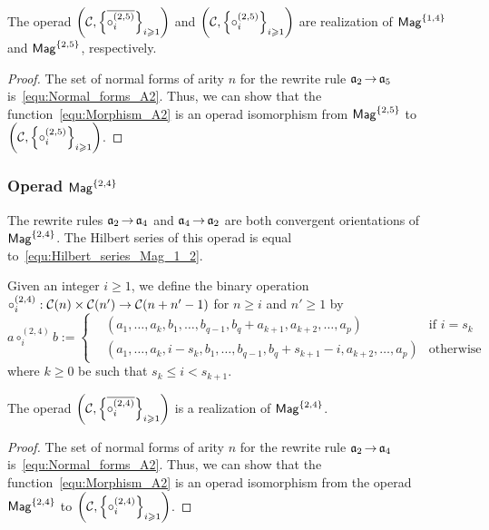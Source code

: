 \begin{Proposition} \label{prop:Realisation_Mag_1_4}
The operad
$\left(\mathcal{C}, \left\{\overline{\circ_i^{(2,5)}}\right\}_{i \geqslant 1}
\right)$ and
$\left(\mathcal{C}, \left\{\circ_i^{(2,5)}\right\}_{i \geqslant 1}\right)$
are realization of $\mathsf{Mag}^{\{1, 4\}}$ and $\mathsf{Mag}^{\{2, 5\}}$, respectively.
\end{Proposition}

\begin{proof}
The set of normal forms of arity $n$ for the rewrite rule
$\mathfrak{a}_2 \operatorname{\to} \mathfrak{a}_5$ is~\eqref{equ:Normal_forms_A2}. Thus, we can show
that the function~\eqref{equ:Morphism_A2} is an operad isomorphism from
$\mathsf{Mag}^{\{2, 5\}}$ to
$\left(\mathcal{C}, \left\{\circ_i^{(2,5)}\right\}_{i \geqslant 1}\right)$.
\end{proof}
\medbreak

\subsubsection{Operad $\mathsf{Mag}^{\{2, 4\}}$}
The rewrite rules $\mathfrak{a}_2 \operatorname{\to} \mathfrak{a}_4$ and $\mathfrak{a}_4 \operatorname{\to} \mathfrak{a}_2$ are both
convergent orientations of $\mathsf{Mag}^{\{2, 4\}}$. The Hilbert series of
this operad is equal to~\eqref{equ:Hilbert_series_Mag_1_2}.
\medbreak

Given an integer $i \geq 1$, we define the
binary operation
$\circ_i^{(2,4)} : \mathcal{C}(n) \times \mathcal{C}(n')\rightarrow
 \mathcal{C}(n + n' -1)$ for
$n \geq i$ and $n' \geq 1$ by
\begin{equation}
a \circ_i^{(2,4)} b := \left\{
    \begin{split}
    & (a_1, \dots, a_{k}, b_1, \dots, b_{q-1}, b_{q} + a_{k+1},
    a_{k+2}, \dots ,a_{p}) & \text{if } i = s_k\\
    & (a_1, \dots, a_{k}, i - s_{k}, b_1, \dots, b_{q-1}, b_{q}
     + s_{k+1} - i, a_{k+2}, \dots ,a_{p}) & \text{otherwise}
    \end{split}
  \right.
\end{equation}
where $k \geq 0$  be such that $s_k \leq i < s_{k+1}$.
\medbreak

\begin{Proposition} \label{prop:Realisation_Mag_2_4}
The operad
$\left(\mathcal{C}, \left\{\overline{\circ_i^{(2,4)}}
\right\}_{i \geqslant 1}
\right)$ is a realization of $\mathsf{Mag}^{\{2, 4\}}$.
\end{Proposition}

\begin{proof}
The set of normal forms of arity $n$ for the rewrite rule
$\mathfrak{a}_2 \operatorname{\to} \mathfrak{a}_4$ is~\eqref{equ:Normal_forms_A2}. Thus, we can show
that the function~\eqref{equ:Morphism_A2} is an operad isomorphism from
the operad $\mathsf{Mag}^{\{2, 4\}}$ to
$\left(\mathcal{C}, \left\{\circ_i^{(2,4)}\right\}_{i \geqslant 1}\right)$.
\end{proof}
\medbreak


